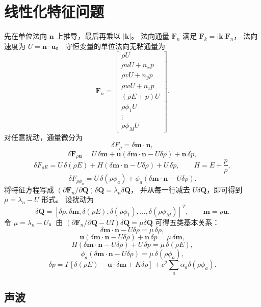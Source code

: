 \documentclass[11pt,a4paper,fontset=fandol]{ctexart}
\newcommand{\kk}{\bm{k}}
\newcommand{\nn}{\bm{n}}
\newcommand{\uu}{\bm{u}}
\newcommand{\QQ}{\bm{Q}}
\newcommand{\FF}{\bm{F}}
\newcommand{\Gammaone}{\Gamma}
\begin{document}
\section{线性化特征问题}

先在单位法向 \(\nn\) 上推导，最后再乘以 \(|\kk|\)。
法向通量 \(\FF_n\) 满足 \(\FF_k=|\kk|\FF_n\)，
法向速度为 \(U=\nn\cdot\uu\)。
守恒变量的单位法向无粘通量为
\[
\FF_n=
\begin{bmatrix}
\rho U\\
\rho uU+n_xp\\
\rho vU+n_yp\\
\rho wU+n_zp\\
(\rho E+p)U\\
\rho\phi_1U\\
\vdots\\
\rho\phi_MU
\end{bmatrix}.
\]
对任意扰动，通量微分为
\[
\delta F_{\rho}=\delta\bm{m}\cdot\nn,
\]
\[
\delta\bm{F}_{\rho\uu}
=U\,\delta\bm{m}
+\uu(\delta\bm{m}\cdot\nn-U\delta\rho)+\nn\,\delta p,
\]
\[
\delta F_{\rho E}
=U\,\delta(\rho E)+H(\delta\bm{m}\cdot\nn-U\delta\rho)+U\,\delta p,
\qquad H=E+\frac{p}{\rho},
\]
\[
\delta F_{\rho\phi_a}
=U\,\delta(\rho\phi_a)+\phi_a(\delta\bm{m}\cdot\nn-U\delta\rho).
\]
将特征方程写成
\((\partial\FF_n/\partial\QQ)\delta\QQ=\lambda_n\delta\QQ\)，
并从每一行减去 \(U\delta\QQ\)，即可得到
\(\mu=\lambda_n-U\) 形式。
设扰动为
\[
\delta\QQ=
\left[\delta\rho,\delta\bm{m},\delta(\rho E),
\delta(\rho\phi_1),\ldots,\delta(\rho\phi_M)\right]^T,
\qquad \bm{m}=\rho\uu .
\]
令 \(\mu=\lambda_n-U\)。由
\((\partial\FF_n/\partial\QQ-U I)\delta\QQ=\mu\delta\QQ\)
可得五类基本关系：
\[
\delta\bm{m}\cdot\nn-U\delta\rho=\mu\,\delta\rho,
\]
\[
\uu(\delta\bm{m}\cdot\nn-U\delta\rho)+\nn\,\delta p=\mu\,\delta\bm{m},
\]
\[
H(\delta\bm{m}\cdot\nn-U\delta\rho)+U\,\delta p=\mu\,\delta(\rho E),
\]
\[
\phi_a(\delta\bm{m}\cdot\nn-U\delta\rho)=\mu\,\delta(\rho\phi_a),
\]
\[
\delta p
=\Gammaone\left[
\delta(\rho E)-\uu\cdot\delta\bm{m}+K\delta\rho\right]
+c^2\sum_a\alpha_a\delta(\rho\phi_a).
\]

\subsection{声波}
\end{document}
